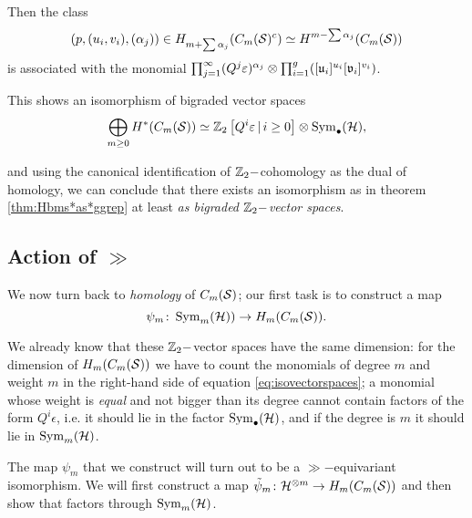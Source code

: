 Then the class 
\[
(p,(u_i,v_i),(\alpha_j))\in H_{m+\sum\alpha_j}(C_m(\mathcal{S})^c)\simeq H^{m-\sum\alpha_j}(C_m(\mathcal{S}))
\]
is associated with the monomial $\prod_{j=1}^{\infty}(Q^j\varepsilon)^{\alpha_j}\otimes \prod_{i=1}^g([\mathfrak{u}_i]^{u_i}[\mathfrak{v}_i]^{v_i})$.

This shows an isomorphism of bigraded vector spaces
\begin{equation}\label{eq:isovectorspaces}
  \bigoplus_{m\geq 0} H^*(C_m(\mathcal{S}))\simeq \mathbb{Z}_2\left[Q^i\varepsilon\,|\, i\geq 0\right]\otimes\operatorname{Sym}_{\bullet}(\mathcal{H}),
\end{equation}

and using the canonical identification of $\mathbb{Z}_2-$cohomology as the dual of homology, we can
conclude that there exists an isomorphism as in theorem \ref{thm:Hbms*as*ggrep}
at least \emph{as bigraded $\mathbb{Z}_2-$vector spaces}.

\subsection{Action of $\gg$} We now turn back to \emph{homology} of $C_m(\mathcal{S})$;
our first task is to construct a map
\[
\psi_m\colon \operatorname{Sym}_m(\mathcal{H}))\to H_m(C_m(\mathcal{S})).
\]

We already know that these $\mathbb{Z}_2-$vector spaces have the same dimension:
for the dimension of $H_m(C_m(\mathcal{S}))$ we have to count the monomials of degree $m$ and weight $m$
in the right-hand side of equation \ref{eq:isovectorspaces}; a monomial whose
weight is \emph{equal} and not bigger than its degree cannot contain factors of the form
$Q^i\epsilon$, i.e. it should lie in the factor $\operatorname{Sym}_{\bullet}(\mathcal{H})$, and if the degree
is $m$ it should lie in $\operatorname{Sym}_m(\mathcal{H})$.

The map $\psi_m$ that we construct will turn out to be a $\gg-$equivariant isomorphism.
We will first construct a map $\tilde\psi_m\colon \mathcal{H}^{\otimes m}\to H_m(C_m(\mathcal{S}))$ and then show
that factors through $\operatorname{Sym}_m(\mathcal{H})$.

